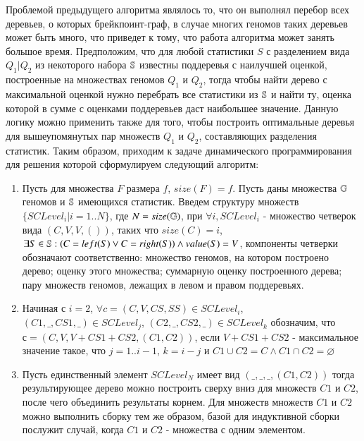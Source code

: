 Проблемой предыдущего алгоритма являлось то, что он выполнял перебор всех деревьев, о которых  брейкпоинт-граф,
в случае многих геномов таких деревьев может быть много, что приведет к тому, что работа алгоритма может занять большое время.
Предположим, что для любой статистики $S$ с разделением вида $Q_1|Q_2$ из некоторого набора $\mathbb{S}$ известны поддеревья с наилучшей оценкой,
построенные на множествах геномов $Q_1$ и $Q_2$, тогда чтобы найти дерево с максимальной оценкой нужно перебрать все статистики из $\mathbb{S}$ и найти ту,
оценка которой в сумме с оценками поддеревьев даст наибольшее значение.
Данную логику можно применить также для того, чтобы построить оптимальные деревья для вышеупомянутых пар множеств $Q_1$ и $Q_2$,
составляющих разделения статистик.
Таким образом, приходим к задаче динамического программирования для решения которой сформулируем следующий алгоритм:
\begin{enumerate}
  \item Пусть для множества $F$ размера $f$, $size(F) = f$.
    Пусть даны множества $\mathbb{G}$ геномов и $\mathbb{S}$ имеющихся статистик.
    Введем структуру множеств $\{ SCLevel_i | i = 1..N \}$, где $N = size(\mathbb{G})$,
    при $\forall i, SCLevel_i$ - множество четверок вида $(C, V, V, ())$, таких что $size(C) = i$,
    $\exists S \in \mathbb{S}: (C = left(S) \vee C = right(S)) \wedge value(S) = V$,
    компоненты четверки обозначают соответственно: множество геномов, на котором построено дерево;
    оценку этого множества; суммарную оценку построенного дерева; пару множеств геномов, лежащих в левом и правом поддеревьях.
  \item Начиная с $i = 2$,
    $\forall c = (C, V, CS, SS) \in SCLevel_i$,
    $(C1, \_, CS1, \_) \in SCLevel_j$,
    $(C2, \_, CS2, \_) \in SCLevel_k$ обозначим, что $с = (C, V, V + CS1 + CS2, (C1, C2))$,
    если $V + CS1 + CS2$ - максимальное значение такое, что $j = 1..i-1$, $k = i - j$ и $C1 \cup C2 = C \wedge C1 \cap C2 = \varnothing$
  \item Пусть единственный элемент $SCLevel_N$ имеет вид $(\_, \_, \_, (C1, C2))$ тогда результирующее дерево можно построить сверху
    вниз для множеств $C1$ и $C2$, после чего объединить результаты корнем.
    Для множеств множеств $C1$ и $C2$ можно выполнить сборку тем же образом, базой для индуктивной сборки послужит случай,
    когда $C1$ и $C2$ - множества с одним элементом.
\end{enumerate}
